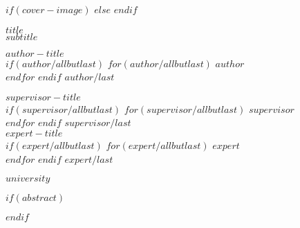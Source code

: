 \begin{titlepage}
  \begin{center}
    \vspace*{5mm}
    $if(cover-image)$
    \vspace{5mm}
    $else$
    \vspace{40mm}
    $endif$
    
    {\textsf{\textbf{\Huge $title$}}}\\
    \vspace{0.3cm}
    \textsf{\textit{\large $subtitle$}}
    
    \vspace{1cm}
    \begin{multicols}{2}
      \begin{flushleft}
        \textsf{\textbf{$author-title$}\normalsize}\\
        $if(author/allbutlast)$
          $for(author/allbutlast)$
            \textsf{$author$}\\
          $endfor$
        $endif$
        \textsf{$author/last$}\\
      \end{flushleft}

      \vfill\null
      \columnbreak

      \begin{flushright}
        \textsf{\textbf{$supervisor-title$}\normalsize}\\
        $if(supervisor/allbutlast)$
          $for(supervisor/allbutlast)$
            \textsf{$supervisor$}\\
          $endfor$
        $endif$
        \textsf{$supervisor/last$}\\[0.4cm]

        \textsf{\textbf{$expert-title$}\normalsize}\\
        $if(expert/allbutlast)$
          $for(expert/allbutlast)$
            \textsf{$expert$}\\
          $endfor$
        $endif$
        \textsf{$expert/last$}

      \end{flushright}
    \end{multicols}
    \vfill
    \textsf{$university$}
  \end{center}
  \normalfont
\end{titlepage}

\restoregeometry

$if(abstract)$
\begin{abstract}
$abstract$
\end{abstract}
$endif$
